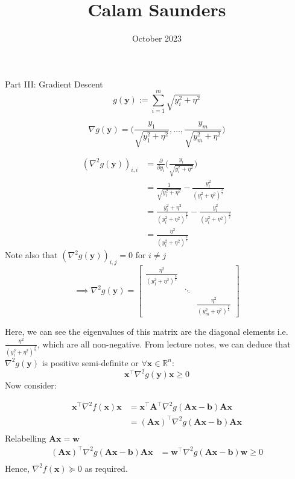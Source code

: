 \documentclass{article}
\title{Calam Saunders}
\date{October 2023}
\begin{document}
\maketitle

Part III: Gradient Descent
$$
g(\mathbf{y}) := \sum_{i=1}^{m}\sqrt{y_i^2+\eta^2}
$$

$$
\nabla g(\mathbf{y}) = \bigg(\frac{y_1}{\sqrt{y_1^2+\eta^2}},  \dots , \frac{y_m}{\sqrt{y_m^2+\eta^2}} \bigg)
$$

\begin{equation}\begin{split}
(\nabla^2g(\mathbf{y}))_{i,i} & = \frac{\partial}{\partial y_i}\bigg( \frac{y_i}{\sqrt{y_i^2+\eta^2}} \bigg) \\
& = \frac{1}{\sqrt{y_i^2+\eta^2}} - \frac{y_i^2}{(y_i^2+\eta^2)^{\frac{3}{2}}} \\
& = \frac{y_i^2 + \eta^2}{(y_i^2+\eta^2)^{\frac{3}{2}}} - \frac{y_i^2}{(y_i^2+\eta^2)^{\frac{3}{2}}} \\
& = \frac{\eta^2}{(y_i^2+\eta^2)^{\frac{3}{2}}}
\end{split}\end{equation}
Note also that $(\nabla^2g(\mathbf{y}))_{i,j} = 0$ for $i \neq j$
$$
\implies \nabla^2g(\mathbf{y}) = 
\begin{bmatrix}
\frac{\eta^2}{(y_1^2+\eta^2)^{\frac{3}{2}}} &  &  \\
 & \ddots & \\
 & & \frac{\eta^2}{(y_m^2+\eta^2)^{\frac{3}{2}}}
\end{bmatrix}
$$

Here, we can see the eigenvalues of this matrix are the diagonal elements i.e. $\frac{\eta^2}{(y_i^2+\eta^2)^{\frac{3}{2}}}$, which are all non-negative. From lecture notes, we can deduce that $\nabla^2g(\mathbf{y})$ is positive semi-definite or $\forall \mathbf{x} \in \mathbb{R}^n$:
$$
\mathbf{x}^\intercal \nabla^2g(\mathbf{y}) \mathbf{x} \geq 0
$$
Now consider:

\begin{equation}\begin{split}
\mathbf{x}^\intercal \nabla^2f(\mathbf{x}) \mathbf{x} & = \mathbf{x}^\intercal \mathbf{A}^\intercal \nabla^2g(\mathbf{Ax-b}) \mathbf{Ax} \\
& = (\mathbf{Ax})^\intercal \nabla^2g(\mathbf{Ax-b}) \mathbf{Ax} \\
\end{split}\end{equation}
Relabelling $\mathbf{Ax} = \mathbf{w}$
\begin{equation}\begin{split}
(\mathbf{Ax})^\intercal \nabla^2g(\mathbf{Ax-b}) \mathbf{Ax} & = \mathbf{w}^\intercal \nabla^2g(\mathbf{Ax-b}) \mathbf{w} \geq 0 \\
\end{split}\end{equation}
Hence, $\nabla^2f(\mathbf{x}) \succcurlyeq 0$ as required.
\end{document}
